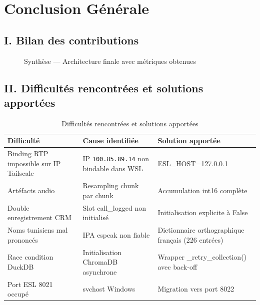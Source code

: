 \chapter*{Conclusion Générale}

\section*{I. Bilan des contributions}


\begin{figure}[H]
  \centering
  
  \caption{Synthèse — Architecture finale avec métriques obtenues}
  \label{fig:conclusion_synthese}
\end{figure}


\section*{II. Difficultés rencontrées et solutions apportées}

\begin{table}[H]
  \centering
  \caption{Difficultés rencontrées et solutions apportées}
  \label{tab:difficulties}
  \begin{tabularx}{\textwidth}{lXX}
    \toprule
    \textbf{Difficulté} & \textbf{Cause identifiée} & \textbf{Solution apportée} \\
    \midrule
    Binding RTP impossible sur IP Tailscale &
      IP \texttt{100.85.89.14} non bindable dans WSL &
      ESL\_HOST=127.0.0.1 \\
    Artéfacts audio &
      Resampling chunk par chunk &
      Accumulation int16 complète \\
    Double enregistrement CRM &
      Slot call\_logged non initialisé &
      Initialisation explicite à False \\
    Noms tunisiens mal prononcés &
      IPA espeak non fiable &
      Dictionnaire orthographique français (226 entrées) \\
    Race condition DuckDB &
      Initialisation ChromaDB asynchrone &
      Wrapper \_retry\_collection() avec back-off \\
    Port ESL 8021 occupé &
      svchost Windows &
      Migration vers port 8022 \\
    \bottomrule
  \end{tabularx}
\end{table}

